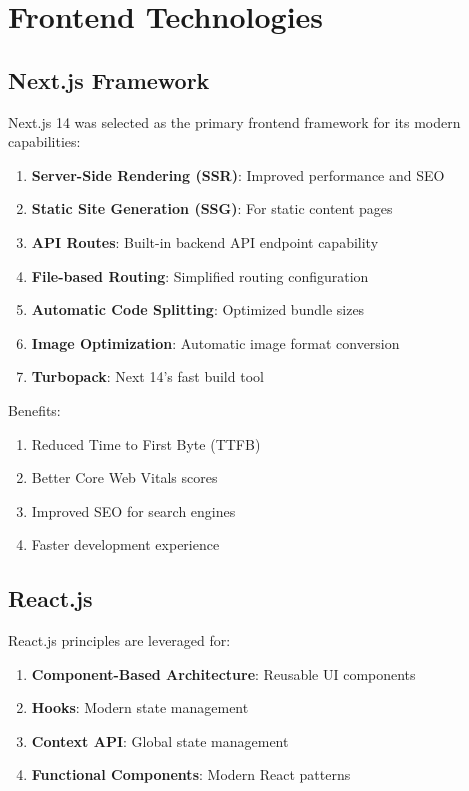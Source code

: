 \documentclass[12pt,a4paper]{report}
\begin{document}
\section{Frontend Technologies}

\subsection{Next.js Framework}

Next.js 14 was selected as the primary frontend framework for its modern capabilities:

\begin{enumerate}[label=\roman*)]
    \item \textbf{Server-Side Rendering (SSR)}: Improved performance and SEO
    \item \textbf{Static Site Generation (SSG)}: For static content pages
    \item \textbf{API Routes}: Built-in backend API endpoint capability
    \item \textbf{File-based Routing}: Simplified routing configuration
    \item \textbf{Automatic Code Splitting}: Optimized bundle sizes
    \item \textbf{Image Optimization}: Automatic image format conversion
    \item \textbf{Turbopack}: Next 14's fast build tool
\end{enumerate}

Benefits:
\begin{enumerate}[label=\roman*)]
    \item Reduced Time to First Byte (TTFB)
    \item Better Core Web Vitals scores
    \item Improved SEO for search engines
    \item Faster development experience
\end{enumerate}

\subsection{React.js}

React.js principles are leveraged for:

\begin{enumerate}[label=\roman*)]
    \item \textbf{Component-Based Architecture}: Reusable UI components
    \item \textbf{Hooks}: Modern state management
    \item \textbf{Context API}: Global state management
    \item \textbf{Functional Components}: Modern React patterns
\end{enumerate}
\end{document}
